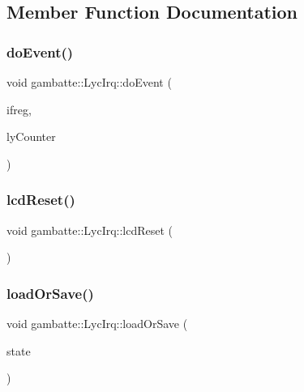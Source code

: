 \subsection{Member Function Documentation}
\mbox{\label{classgambatte_1_1LycIrq_aa89cc468ccee7c8c9012f7ec31b2b900}} 
\subsubsection{\texorpdfstring{do\+Event()}{doEvent()}}
{\footnotesize\ttfamily void gambatte\+::\+Lyc\+Irq\+::do\+Event (\begin{DoxyParamCaption}\item[{unsigned char $\ast$}]{ifreg,  }\item[{\hyperlink{classgambatte_1_1LyCounter}{Ly\+Counter} const \&}]{ly\+Counter }\end{DoxyParamCaption})}

\mbox{\label{classgambatte_1_1LycIrq_a321338c36a2b5f6b2a24092134cc7b86}} 
\subsubsection{\texorpdfstring{lcd\+Reset()}{lcdReset()}}
{\footnotesize\ttfamily void gambatte\+::\+Lyc\+Irq\+::lcd\+Reset (\begin{DoxyParamCaption}{ }\end{DoxyParamCaption})}

\mbox{\label{classgambatte_1_1LycIrq_add90bd20cfb838f5fa3ad17bb11af885}} 
\subsubsection{\texorpdfstring{load\+Or\+Save()}{loadOrSave()}}
{\footnotesize\ttfamily void gambatte\+::\+Lyc\+Irq\+::load\+Or\+Save (\begin{DoxyParamCaption}\item[{\hyperlink{classgambatte_1_1loadsave}{loadsave} \&}]{state }\end{DoxyParamCaption})\hspace{0.3cm}{\ttfamily [inline]}}

